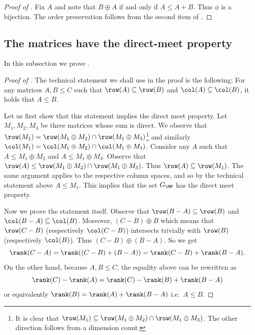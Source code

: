 \begin{proof}[Proof of ]
    Fix \(A\) and note that \(B \oplus A\) if and only if \(A \leq A+B\). Thus \(\phi\) is a bijection. The order preservation follows from the second item of .
\end{proof}

\subsection{The matrices have the direct-meet property} \label{app:direct-meet-matrices}
In this subsection we prove .
\begin{proof}[Proof of ]
    The technical statement we shall use in the proof is the following: For any matrices \(A,B \leq C\) such that \(\row(A) \subseteq \row(B)\) and \(\col(A) \subseteq \col(B)\), it holds that \(A \leq B\).

    Let us first show that this statement implies the direct meet property. Let \(M_1,M_2,M_3\) be three matrices whose sum is direct. We observe that \(\row(M_1) = \row(M_1 \oplus M_2) \cap \row(M_1 \oplus M_3)\)\footnote{It is clear that \(\row(M_1) \subseteq  \row(M_1 \oplus M_2) \cap \row(M_1 \oplus M_3)\). The other direction follows from a dimension count.} and similarly \(\col(M_1) = \col(M_1 \oplus M_2) \cap \col(M_1 \oplus M_3)\). Consider any $A$ such that \(A \leq M_1 \oplus M_2\) and \(A \leq M_1 \oplus M_3\). Observe that \(\row(A) \leq \row(M_1 \oplus M_2) \cap \row(M_1 \oplus M_3)\). Thus \(\row(A) \subseteq \row(M_1)\). The same argument applies to the respective column spaces, and so by the technical statement above \(A \leq M_1\). This implies that the set \(G_{\MP}\) has the direct meet property.

    Now we prove the statement itself. Observe that \(\row(B-A) \subseteq \row(B)\) and \(\col(B-A) \subseteq \col(B)\). Moreover, \((C-B) \oplus B\) which means that \(\row(C-B)\) (respectively \(\col(C-B)\)) intersects trivially with \(\row(B)\) (respectively \(\col(B)\)). Thus \((C-B) \oplus (B-A)\). So we get
    \[ \rank(C-A) = \rank((C-B) + (B-A)) = \rank(C-B) + \rank(B-A).\]
    On the other hand, because \(A,B \leq C\), the equality above can be rewritten as
    \[\rank(C) - \rank(A) = \rank(C) - \rank(B) + \rank(B-A)\]
    or equivalently \(\rank(B) = \rank(A) + \rank(B-A)\) i.e.\ \(A \leq B\).
\end{proof}

